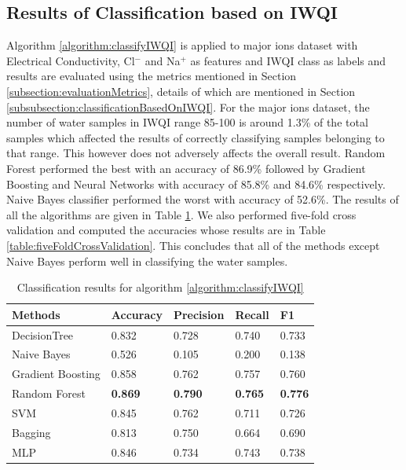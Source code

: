\documentclass[conference]{IEEEtran}
\begin{document}
\subsection{Results of Classification based on IWQI}
\label{subsection:resultsOfClassificationBasedOnIWQI}
Algorithm \ref{algorithm:classifyIWQI} is applied to major ions dataset with Electrical Conductivity, Cl$^-$ and Na$^+$ as features and IWQI class as labels and results are evaluated using the metrics mentioned in Section \ref{subsection:evaluationMetrics}, details of which are mentioned in Section \ref{subsubsection:classificationBasedOnIWQI}. For the major ions dataset, the number of water samples in IWQI range 85-100 is around 1.3\% of the total samples which affected the results of correctly classifying samples belonging to that range. This however does not adversely affects the overall result. Random Forest performed the best with an accuracy of 86.9\% followed by Gradient Boosting and Neural Networks with accuracy of 85.8\% and 84.6\% respectively. Naive Bayes classifier performed the worst with accuracy of 52.6\%. The results of all the algorithms are given in Table \ref{table:classificationResults}. We also performed five-fold cross validation and computed the accuracies whose results are in Table \ref{table:fiveFoldCrossValidation}. This concludes that all of the methods except Naive Bayes perform well in classifying the water samples.
\begin{table}
    \centering
    \caption{Classification results for algorithm \ref{algorithm:classifyIWQI}}
    \begin{tabular}{|l|l|l|l|l|}
    \hline
        \textbf{Methods} & \textbf{Accuracy} & \textbf{Precision} & \textbf{Recall} & \textbf{F1} \\ \hline
        DecisionTree & 0.832 & 0.728 & 0.740 & 0.733 \\ \hline
        Naive Bayes & 0.526 & 0.105 & 0.200 & 0.138 \\ \hline
        Gradient Boosting & 0.858 & 0.762 & 0.757 & 0.760 \\ \hline
        Random Forest & \textbf{0.869} & \textbf{0.790} & \textbf{0.765} & \textbf{0.776} \\ \hline
        SVM & 0.845 & 0.762 & 0.711 & 0.726 \\ \hline
        Bagging & 0.813 & 0.750 & 0.664 & 0.690 \\ \hline
        MLP & 0.846 & 0.734 & 0.743 & 0.738 \\ \hline
    \end{tabular}
    \label{table:classificationResults}
\end{table}
\end{document}
